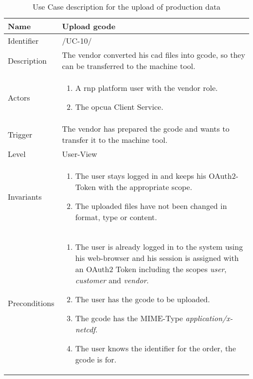 \documentclass[
a4paper,
twoside,
headsepline,
cleardoublepage=empty,
parskip=half,
draft=false
]{scrbook}
\begin{document}
				\begin{table}[hbtp]
					\centering
					\caption{Use Case description for the upload of production data}
					\label{tab:use_case_upload}
					\begin{tabular}{L R}%
						\toprule
						Name & Upload \gls{gcode}
						\\ \midrule
						Identifier & /UC-10/
						\\ \midrule
						Description & The vendor converted his \gls{cad} files into \gls{gcode}, so they can be transferred to the machine tool.
						\\ \midrule
						Actors & \begin{enumerate}\item A \gls{rnp} platform user with the vendor role. \item The \gls{opcua} Client Service.\end{enumerate}
						\\ \midrule
						Trigger & The vendor has prepared the \gls{gcode} and wants to transfer it to the machine tool.
						\\ \midrule
						Level & User-View
						\\ \midrule
						Invariants & \begin{enumerate}\item The user stays logged in and keeps his OAuth2-Token with the appropriate scope. \item The uploaded files have not been changed in format, type or content.\end{enumerate}
						\\ \midrule
						Preconditions &
						\begin{enumerate}
							\item The user is already logged in to the system using his web-browser and his session is assigned with an OAuth2 Token including the scopes \textit{user}, \textit{customer} and \textit{vendor}.
							\item The user has the \gls{gcode} to be uploaded.
							\item The \gls{gcode} has the MIME-Type \textit{application/x-netcdf}.
							\item The user knows the identifier for the order, the \gls{gcode} is for.
						\end{enumerate}
						\\ \midrule

\end{tabular}
\end{table}
\end{document}
